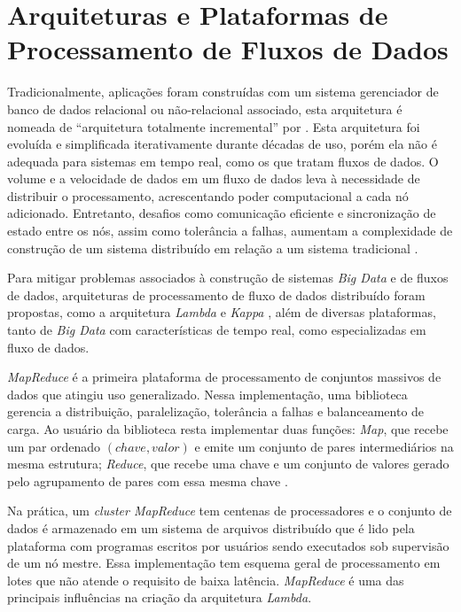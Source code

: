 \section{Arquiteturas e Plataformas de Processamento de Fluxos de Dados}
\label{sec:frameworks}


Tradicionalmente, aplicações foram construídas com um sistema gerenciador de
banco de dados relacional ou não-relacional associado, esta arquitetura é
nomeada de ``arquitetura totalmente incremental'' por .
Esta arquitetura foi evoluída e simplificada iterativamente durante décadas de
uso, porém ela não é adequada para sistemas em tempo real, como os que tratam
fluxos de dados.
O volume e a velocidade de dados em um fluxo de dados leva à necessidade de
distribuir o processamento, acrescentando poder computacional a cada nó
adicionado.
Entretanto, desafios como comunicação eficiente e sincronização de estado
entre os nós, assim como tolerância a falhas, aumentam a complexidade de
construção de um sistema distribuído em relação a um sistema tradicional
\cite{marz2015big}.

\newcommand{\lambdaa}{\xspace\emph{Lambda}\xspace}
\newcommand{\kappaa}{\xspace\emph{Kappa}\xspace}

Para mitigar problemas associados à construção de sistemas \emph{Big Data} e de
fluxos de dados, arquiteturas de processamento de fluxo de dados distribuído
foram propostas, como a arquitetura \lambdaa \cite{marz2015big} e \kappaa
\cite{Kreps2014}, além de diversas plataformas, tanto de \emph{Big Data} com
características de tempo real, como especializadas em fluxo de dados.

\emph{MapReduce} é a primeira plataforma de processamento de conjuntos massivos
de dados que atingiu uso generalizado.
Nessa implementação, uma biblioteca gerencia a distribuição, paralelização,
tolerância a falhas e balanceamento de carga.
Ao usuário da biblioteca resta implementar duas funções:
\emph{Map}, que recebe um par ordenado
$(chave, valor)$ e emite um conjunto de pares intermediários na mesma estrutura;
\emph{Reduce}, que recebe uma chave e um conjunto de valores gerado pelo agrupamento
de pares com essa mesma chave \cite{Dean2004}.

Na prática, um \emph{cluster MapReduce} tem centenas de processadores e o
conjunto de dados é armazenado em um sistema de arquivos distribuído que é lido
pela plataforma com programas escritos por usuários sendo executados sob
supervisão de um nó mestre.
Essa implementação tem esquema geral de processamento em lotes que não atende o
requisito de baixa latência.
\emph{MapReduce} é uma das principais influências na criação da
arquitetura \lambdaa \cite{marz2015big}.

